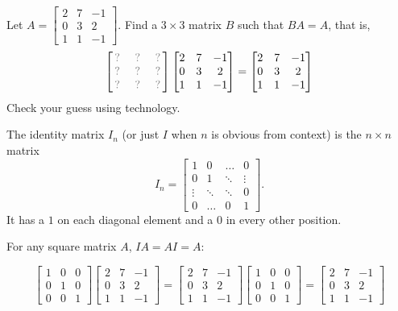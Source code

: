 \begin{applicationActivities}
\begin{activity}{5}
Let \(A=\begin{bmatrix} 2 & 7 & -1 \\ 0 & 3 & 2 \\ 1 & 1 & -1 \end{bmatrix}\).  
Find a \(3 \times 3\) matrix \(B\) such that \(BA=A\), that is,
\[
  \begin{bmatrix} \unknown & \unknown & \unknown \\ 
  \unknown & \unknown & \unknown 
  \\ \unknown & \unknown & \unknown \end{bmatrix}
  \begin{bmatrix} 2 & 7 & -1 \\ 0 & 3 & 2 \\ 1 & 1 & -1 \end{bmatrix}
=
  \begin{bmatrix} 2 & 7 & -1 \\ 0 & 3 & 2 \\ 1 & 1 & -1 \end{bmatrix}
\]
Check your guess using technology.
\end{activity}

\begin{definition}
The identity matrix $I_n$ (or just $I$ when $n$ is obvious from context) is  the $n \times n$ matrix $$I_n = \begin{bmatrix} 1 & 0  & \hdots & 0 \\ 0 & 1 & \ddots & \vdots  \\ \vdots & \ddots & \ddots & 0 \\ 0 & \hdots & 0 & 1 \end{bmatrix}.$$
It has a $1$ on each diagonal element and a $0$ in every other position.
\end{definition}

\begin{fact}
  For any square matrix \(A\), \(IA=AI=A\):

  \[
    \begin{bmatrix} 1 & 0 & 0 \\ 0 & 1 & 0 \\ 0 & 0 & 1 \end{bmatrix}
    \begin{bmatrix} 2 & 7 & -1 \\ 0 & 3 & 2 \\ 1 & 1 & -1 \end{bmatrix}
  =
    \begin{bmatrix} 2 & 7 & -1 \\ 0 & 3 & 2 \\ 1 & 1 & -1 \end{bmatrix}
      \begin{bmatrix} 1 & 0 & 0 \\ 0 & 1 & 0 \\ 0 & 0 & 1 \end{bmatrix}
  =
    \begin{bmatrix} 2 & 7 & -1 \\ 0 & 3 & 2 \\ 1 & 1 & -1 \end{bmatrix}
  \]
\end{fact}


\end{applicationActivities}
